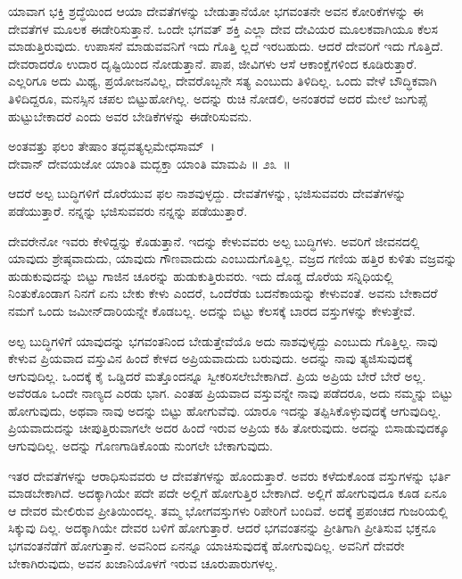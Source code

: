 ಯಾವಾಗ ಭಕ್ತಿ ಶ್ರದ್ಧೆಯಿಂದ ಆಯಾ ದೇವತೆಗಳನ್ನು ಬೇಡುತ್ತಾನೆಯೋ ಭಗವಂತನೇ ಅವನ ಕೋರಿಕೆಗಳನ್ನು ಈ ದೇವತೆಗಳ ಮೂಲಕ ಈಡೇರಿಸುತ್ತಾನೆ. ಒಂದೇ ಭಗವತ್ ಶಕ್ತಿ ಎಲ್ಲಾ ದೇವ ದೇವಿಯರ ಮೂಲಕವಾಗಿಯೂ ಕೆಲಸ ಮಾಡುತ್ತಿರುವುದು. ಉಪಾಸನೆ ಮಾಡುವವನಿಗೆ ಇದು ಗೊತ್ತಿ ಲ್ಲದೆ ಇರಬಹುದು. ಆದರೆ ದೇವರಿಗೆ ಇದು ಗೊತ್ತಿದೆ. ದೇವರಾದರೊ ಉದಾರ ದೃಷ್ಟಿಯಿಂದ ನೋಡುತ್ತಾನೆ. ಪಾಪ, ಜೀವಿಗಳು ಆಸೆ ಆಕಾಂಕ್ಷೆಗಳಿಂದ ಕೂಡಿರುತ್ತಾರೆ. ಎಲ್ಲರಿಗೂ ಅದು ಮಿಥ್ಯ, ಪ್ರಯೋಜನವಿಲ್ಲ, ದೇವರೊಬ್ಬನೇ ಸತ್ಯ ಎಂಬುದು ತಿಳಿದಿಲ್ಲ. ಒಂದು ವೇಳೆ ಬೌದ್ಧಿಕವಾಗಿ ತಿಳಿದಿದ್ದರೂ, ಮನಸ್ಸಿನ ಚಪಲ ಬಿಟ್ಟುಹೋಗಿಲ್ಲ. ಅದನ್ನು ರುಚಿ ನೋಡಲಿ, ಅನಂತರವೆ ಅದರ ಮೇಲೆ ಜುಗುಪ್ಸೆ ಹುಟ್ಟುಬೇಕಾದರೆ ಎಂದು ಅವರ ಬೇಡಿಕೆಗಳನ್ನು ಈಡೇರಿಸುವನು.

\begin{shloka}
ಅಂತವತ್ತು ಫಲಂ ತೇಷಾಂ ತದ್ಭವತ್ಯಲ್ಪಮೇಧಸಾಮ್~।\\ದೇವಾನ್ ದೇವಯಜೋ ಯಾಂತಿ ಮದ್ಭಕ್ತಾ ಯಾಂತಿ ಮಾಮಪಿ \hfill॥ ೨೩~॥
\end{shloka}

\begin{artha}
ಆದರೆ ಅಲ್ಪ ಬುದ್ಧಿಗಳಿಗೆ ದೊರೆಯುವ ಫಲ ನಾಶವುಳ್ಳದ್ದು. ದೇವತೆಗಳನ್ನು, ಭಜಿಸುವವರು ದೇವತೆಗಳನ್ನು ಪಡೆಯುತ್ತಾರೆ. ನನ್ನನ್ನು ಭಜಿಸುವವರು ನನ್ನನ್ನು ಪಡೆಯುತ್ತಾರೆ.
\end{artha}

ದೇವರೇನೋ ಇವರು ಕೇಳಿದ್ದನ್ನು ಕೊಡುತ್ತಾನೆ. ಇದನ್ನು ಕೇಳುವವರು ಅಲ್ಪ ಬುದ್ಧಿಗಳು. ಅವರಿಗೆ ಜೀವನದಲ್ಲಿ ಯಾವುದು ಶ್ರೇಷ್ಠವಾದುದು, ಯಾವುದು ಗೌಣವಾದುದು ಎಂಬುದು\break ಗೊತ್ತಿಲ್ಲ. ವಜ್ರದ ಗಣಿಯ ಹತ್ತಿರ ಕುಳಿತು ವಜ್ರವನ್ನು ಹುಡುಕುವುದನ್ನು ಬಿಟ್ಟು ಗಾಜಿನ ಚೂರನ್ನು ಹುಡುಕುತ್ತಿರುವರು. ಇದು ದೊಡ್ಡ ದೊರೆಯ ಸನ್ನಿಧಿಯಲ್ಲಿ ನಿಂತುಕೊಂಡಾಗ ನಿನಗೆ ಏನು ಬೇಕು ಕೇಳು ಎಂದರೆ, ಒಂದೆರೆಡು ಬದನೆಕಾಯನ್ನು ಕೇಳುವಂತೆ. ಅವನು ಬೇಕಾದರೆ ನಮಗೆ ಒಂದು ಜಮೀನ್​ದಾರಿಯನ್ನೇ ಕೊಡಬಲ್ಲ. ಅದನ್ನು ಬಿಟ್ಟು ಕೆಲಸಕ್ಕೆ ಬಾರದ ವಸ್ತುಗಳನ್ನು ಕೇಳುತ್ತೇವೆ.

ಅಲ್ಪ ಬುದ್ಧಿಗಳಿಗೆ ಯಾವುದನ್ನು ಭಗವಂತನಿಂದ ಬೇಡುತ್ತೇವೆಯೊ ಅದು ನಾಶವುಳೃದ್ದು ಎಂಬುದು ಗೊತ್ತಿಲ್ಲ. ನಾವು ಕೇಳುವ ಪ್ರಿಯವಾದ ವಸ್ತುವಿನ ಹಿಂದೆ ಕೇಳದ ಅಪ್ರಿಯವಾದುದು ಬರುವುದು. ಅದನ್ನು ನಾವು ತ್ಯಜಿಸುವುದಕ್ಕೆ ಆಗುವುದಿಲ್ಲ. ಒಂದಕ್ಕೆ ಕೈ ಒಡ್ಡಿದರೆ ಮತ್ತೊಂದನ್ನೂ ಸ್ವೀಕರಿಸಲೇಬೇಕಾಗಿದೆ. ಪ್ರಿಯ ಅಪ್ರಿಯ ಬೇರೆ ಬೇರೆ ಅಲ್ಲ. ಅವೆರಡೂ ಒಂದೇ ನಾಣ್ಯದ ಎರಡು ಭಾಗ. ಎಂತಹ ಪ್ರಿಯವಾದ ವಸ್ತುವನ್ನೇ ನಾವು ಪಡೆದರೂ, ಅದು ನಮ್ಮನ್ನು ಬಿಟ್ಟು ಹೋಗುವುದು, ಅಥವಾ ನಾವು ಅದನ್ನು ಬಿಟ್ಟು ಹೋಗುವೆವು. ಯಾರೂ ಇದನ್ನು ತಪ್ಪಿಸಿಕೊಳ್ಳುವುದಕ್ಕೆ ಆಗುವುದಿಲ್ಲ. ಪ್ರಿಯವಾದುದನ್ನು ಚೀಪುತ್ತಿರುವಾಗಲೇ ಅದರ ಹಿಂದೆ ಇರುವ ಅಪ್ರಿಯ ಕಹಿ ತೋರುವುದು. ಅದನ್ನು ಬಿಸಾಡುವುದಕ್ಕೂ ಆಗುವುದಿಲ್ಲ. ಅದನ್ನು ಗೊಣಗಾಡಿಕೊಂಡು ನುಂಗಲೇ ಬೇಕಾಗುವುದು.

ಇತರ ದೇವತೆಗಳನ್ನು ಆರಾಧಿಸುವವರು ಆ ದೇವತೆಗಳನ್ನು ಹೊಂದುತ್ತಾರೆ. ಅವರು ಕಳೆದುಕೊಂಡ ವಸ್ತುಗಳನ್ನು ಭರ್ತಿ ಮಾಡಬೇಕಾಗಿದೆ. ಅದಕ್ಕಾಗಿಯೇ ಪದೇ ಪದೇ ಅಲ್ಲಿಗೆ ಹೋಗುತ್ತಿರ ಬೇಕಾಗಿದೆ. ಅಲ್ಲಿಗೆ ಹೋಗುವುದೂ ಕೂಡ ಏನೂ ಆ ದೇವರ ಮೇಲಿರುವ ಪ್ರೀತಿಯಿಂದಲ್ಲ. ತಮ್ಮ ಭೋಗವಸ್ತುಗಳು ರಿಪೇರಿಗೆ ಬಂದಿವೆ. ಅದಕ್ಕೆ  ಪ್ರಪಂಚದ ಗುಜರಿಯಲ್ಲಿ ಸಿಕ್ಕುವು ದಿಲ್ಲ. ಅದಕ್ಕಾಗಿಯೇ ದೇವರ ಬಳಿಗೆ ಹೋಗುತ್ತಾರೆ. ಆದರೆ ಭಗವಂತನನ್ನು ಪ್ರೀತಿಗಾಗಿ ಪ್ರೀತಿಸುವ ಭಕ್ತನೂ ಭಗವಂತನೆಡೆಗೆ ಹೋಗುತ್ತಾನೆ. ಅವನಿಂದ ಏನನ್ನೂ ಯಾಚಿಸುವುದಕ್ಕೆ ಹೋಗುವುದಿಲ್ಲ. ಅವನಿಗೆ ದೇವರೇ ಬೇಕಾಗಿರುವುದು, ಅವನ ಖಜಾನಿಯೊಳಗೆ ಇರುವ ಚೂರುಪಾರುಗಳಲ್ಲ.

